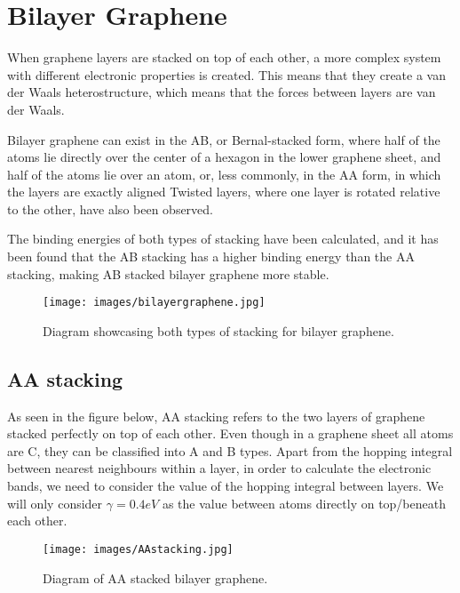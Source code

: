 \documentclass[a4paper,12pt]{report}
\begin{document}
\section{Bilayer Graphene}

When graphene layers are stacked on top of each other, a more complex system with different electronic properties is created. This means that they create a van der Waals heterostructure, which means that the forces between layers are van der Waals. 

Bilayer graphene can exist in the AB, or Bernal-stacked form, where half of the atoms lie directly over the center of a hexagon in the lower graphene sheet, and half of the atoms lie over an atom, or, less commonly, in the AA form, in which the layers are exactly aligned Twisted layers, where one layer is rotated relative to the other, have also been observed. 

The binding energies of both types of stacking have been calculated, and it has been found that the AB stacking has a higher binding energy than the AA stacking, making AB stacked bilayer graphene more stable. 

\begin{figure}[H]
	\begin{center}
		\texttt{[image: images/bilayergraphene.jpg]}
	\end{center}
	\caption{Diagram showcasing both types of stacking for bilayer graphene. } 
	\label{fig:bilayergraphene}
\end{figure}

\subsection{AA stacking}

As seen in the figure below, AA stacking refers to the two layers of graphene stacked perfectly on top of each other. Even though in a graphene sheet all atoms are C, they can be classified into A and B types. Apart from the hopping integral between nearest neighbours within a layer, in order to calculate the electronic bands, we need to consider the value of the hopping integral between layers. We will only consider $\gamma = 0.4 eV$ as the value between atoms directly on top/beneath each other. 

\begin{figure}[h]
	\begin{center}
		\texttt{[image: images/AAstacking.jpg]}
	\end{center}
	\caption{Diagram of AA stacked bilayer graphene. } 
	\label{fig:AAbilayergraphene}
\end{figure}
\end{document}
